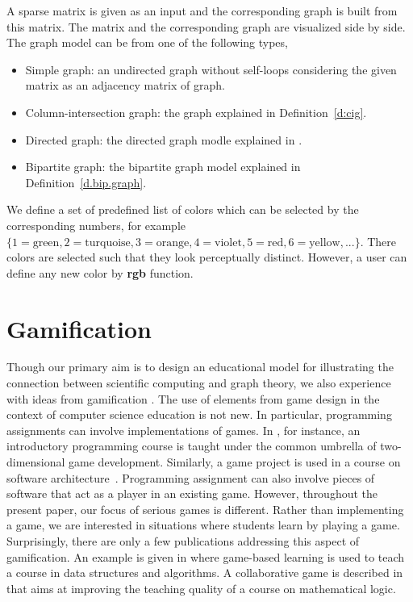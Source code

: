 \documentclass[11pt, twoside,a4paper]{book}
\newcommand{\defref}[1]{Definition~\protect\ref{#1}}
\begin{document}
A sparse matrix is given as an input and the corresponding graph is built from this matrix.
The matrix and the corresponding graph are visualized side by side.
The graph model can be from one of the following types,
\begin{itemize}
\item Simple graph: an undirected graph without self-loops considering the given matrix as an adjacency matrix of graph.
\item Column-intersection graph: the graph explained in \defref{d:cig}.
\item Directed graph: the directed graph modle explained in \cite{Gebremedhin05whatcolor}.
\item Bipartite graph: the bipartite graph model explained in \defref{d.bip.graph}.
\end{itemize}

We define a set of predefined list of colors which can be selected by
the corresponding numbers, for example
$\{1=\text{green}, 2=\text{turquoise}, 3=\text{orange}, 4=\text{violet},
5=\text{red}, 6=\text{yellow}, ...\}$.
There colors are selected such that they look perceptually distinct.
However, a user can define any new color by \textbf{rgb} function.

\section{Gamification}
\label{s.game}
Though our primary aim is to design an educational model for illustrating the connection between
scientific computing and graph theory, we also experience with ideas from gamification
\cite{deterding2011:gug,deterding2011}. The use of elements from game design in the context of
computer science education is not new. In particular, programming assignments can involve
implementations of games. In \cite{la2007:gfa}, for instance, an introductory programming course is
taught under the common umbrella of two-dimensional game development. Similarly, a game project is
used in a course on software architecture~\cite{Wang2011:EEU}. Programming assignment can also
involve pieces of software that act as a player in an existing game. However, throughout the
present paper, our focus of serious games is different. Rather than implementing a game, we are
interested in situations where students learn by playing a game. Surprisingly, there are only a few
publications addressing this aspect of gamification. An example is given in
\cite{Hakulinen2011:usg} where game-based learning is used to teach a course in data structures and
algorithms. A collaborative game is described in \cite{shl:bsc} that aims at improving the teaching
quality of a course on mathematical logic.
\end{document}
